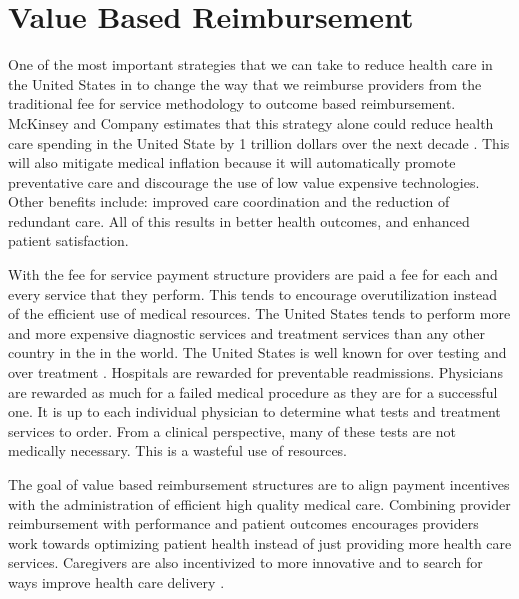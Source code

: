 \documentclass[sigconf]{acmart}
\begin{document}
\section{Value Based Reimbursement}
One of the most important strategies that we can take to reduce health care in the United States in to change the way that we reimburse providers from the traditional fee for service methodology to outcome based reimbursement.  McKinsey and Company estimates that this strategy alone could reduce health care spending in the United State by 1 trillion dollars over the next decade \cite{www-google-trillion}.  This will also mitigate medical inflation because it will automatically promote preventative care and discourage the use of low value expensive technologies.  Other benefits include:  improved care coordination and the reduction of redundant care.  All of this results in better health outcomes, and enhanced patient satisfaction.

With the fee for service payment structure providers are paid a fee for each and every service that they perform. This tends to encourage overutilization instead of the efficient use of medical resources. The United States tends to perform more and more expensive diagnostic services and treatment services than any other country in the in the world. The United States is well known for over testing and over treatment \cite{www-google-PBSO}.  Hospitals are rewarded for preventable readmissions. Physicians are rewarded as much for a failed medical procedure as they are for a successful one.  It is up to each individual physician to determine what tests and treatment services to order.  From a clinical perspective, many of these tests are not medically necessary. This is a wasteful use of resources.

The goal of value based reimbursement structures are to align payment incentives with the administration of efficient high quality medical care. Combining provider reimbursement with performance and patient outcomes encourages providers work towards optimizing patient health instead of just providing more health care services.  Caregivers are also incentivized to more innovative and to search for ways improve health care delivery \cite{www-google-christian}.
\end{document}
